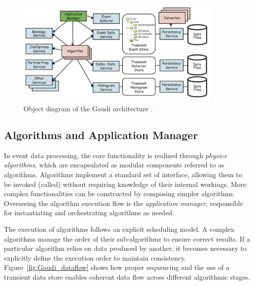 \begin{figure}[htbp]
  \centering
  \includegraphics[width=0.9\textwidth]{figs/chapter3/Gaudi_object_diagram.png}
  \caption{Object diagram of the Gaudi architecture \cite{Gaudi}.}
  \label{fig:Gaudi_object_diagram}
\end{figure}

\subsection{Algorithms and Application Manager}
In event data processing, the core functionality is realized through \textit{physics algorithms}, which are encapsulated as modular components referred to as algorithms. Algorithms implement a standard set of interface, allowing them to be invoked (called) without requiring knowledge of their internal workings. More complex functionalities can be constructed by composing simpler algorithms. Overseeing the algorithm execution flow is the \textit{application manager}, responsible for instantiating and orchestrating algorithms as needed.

The execution of algorithms follows an explicit scheduling model. A complex algorithms manage the order of their sub-algorithms to ensure correct results. If a particular algorithm relies on data produced by another, it becomes necessary to explicitly define the execution order to maintain consistency. Figure~\ref{fig:Gaudi_dataflow} shows how proper sequencing and the use of a transient data store enables coherent data flow across different algorithmic stages.

